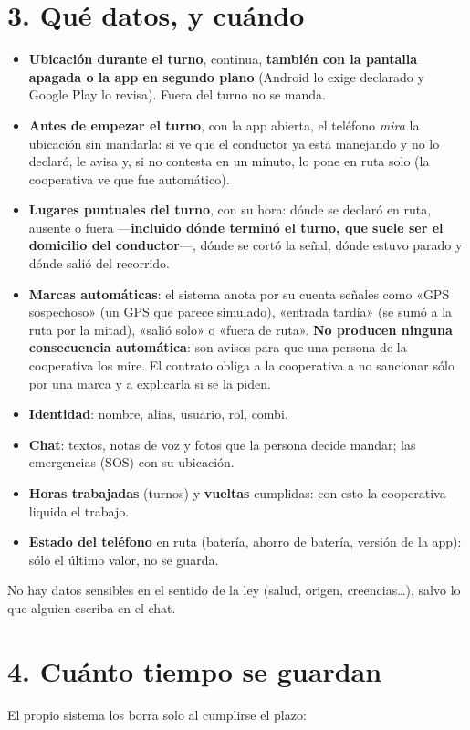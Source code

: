 \documentclass[10.5pt,a4paper]{article}
\begin{document}
\section{3. Qué datos, y cuándo}
\begin{itemize}[leftmargin=14pt]
\item \textbf{Ubicación durante el turno}, continua, \textbf{también con la
  pantalla apagada o la app en segundo plano} (Android lo exige declarado y
  Google Play lo revisa). Fuera del turno no se manda.
\item \textbf{Antes de empezar el turno}, con la app abierta, el teléfono
  \emph{mira} la ubicación sin mandarla: si ve que el conductor ya está
  manejando y no lo declaró, le avisa y, si no contesta en un minuto, lo pone
  en ruta solo (la cooperativa ve que fue automático).
\item \textbf{Lugares puntuales del turno}, con su hora: dónde se declaró en
  ruta, ausente o fuera ---\textbf{incluido dónde terminó el turno, que suele
  ser el domicilio del conductor}---, dónde se cortó la señal, dónde estuvo
  parado y dónde salió del recorrido.
\item \textbf{Marcas automáticas}: el sistema anota por su cuenta señales
  como «GPS sospechoso» (un GPS que parece simulado), «entrada tardía» (se
  sumó a la ruta por la mitad), «salió solo» o «fuera de ruta». \textbf{No
  producen ninguna consecuencia automática}: son avisos para que una persona
  de la cooperativa los mire. El contrato obliga a la cooperativa a no
  sancionar sólo por una marca y a explicarla si se la piden.
\item \textbf{Identidad}: nombre, alias, usuario, rol, combi.
\item \textbf{Chat}: textos, notas de voz y fotos que la persona decide
  mandar; las emergencias (SOS) con su ubicación.
\item \textbf{Horas trabajadas} (turnos) y \textbf{vueltas} cumplidas: con
  esto la cooperativa liquida el trabajo.
\item \textbf{Estado del teléfono} en ruta (batería, ahorro de batería,
  versión de la app): sólo el último valor, no se guarda.
\end{itemize}
No hay datos sensibles en el sentido de la ley (salud, origen, creencias…),
salvo lo que alguien escriba en el chat.

\section{4. Cuánto tiempo se guardan}
El propio sistema los borra solo al cumplirse el plazo:
\end{document}
